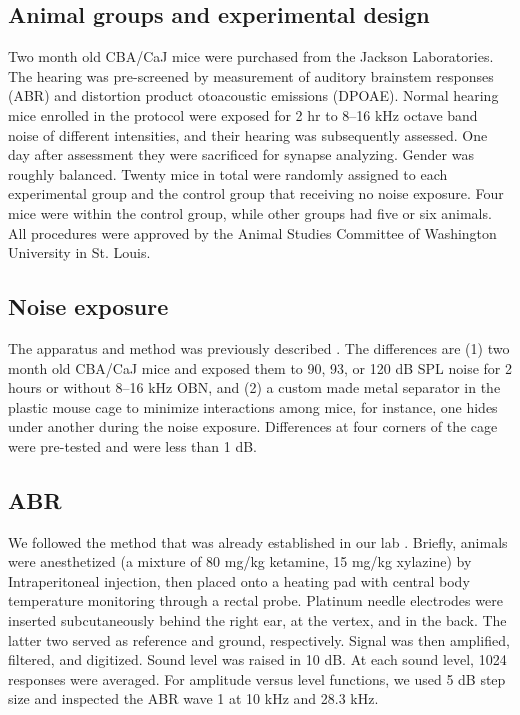 \documentclass[11pt]{article}
\begin{document}
\subsection {Animal groups and experimental design}
Two month old CBA/CaJ mice were purchased from the Jackson Laboratories. The hearing was pre-screened by measurement of auditory brainstem responses (ABR) and distortion product otoacoustic emissions (DPOAE). Normal hearing mice enrolled in the protocol were exposed for 2 hr to 8--16 kHz octave band noise of different intensities, and their hearing was subsequently assessed. One day after assessment they were sacrificed for synapse analyzing. Gender was roughly balanced. Twenty mice in total were randomly assigned to each experimental group and the control group that receiving no noise exposure. Four mice were within the control group, while other groups had five or six animals. All procedures were approved by the Animal Studies Committee of Washington University in St. Louis.

\subsection {Noise exposure}
The apparatus and method was previously described \cite{Ohlemiller2011}. The differences are (1) two month old CBA/CaJ mice and exposed them to 90, 93, or 120 dB SPL noise for 2 hours or without 8--16 kHz OBN, and (2) a custom made metal separator in the plastic mouse cage to minimize interactions among mice, for instance, one hides under another during the noise exposure. Differences at four corners of the cage were pre-tested and were less than 1 dB.

\subsection {ABR}
We followed the method that was already established in our lab \cite{Lei2011}. Briefly, animals were anesthetized (a mixture of 80 mg/kg ketamine, 15 mg/kg xylazine) by Intraperitoneal injection, then placed onto a heating pad with central body temperature monitoring through a rectal probe. Platinum needle electrodes were inserted subcutaneously behind the right ear, at the vertex, and in the back. The latter two served as reference and ground, respectively. Signal was then amplified, filtered, and digitized. Sound level was raised in 10 dB. At each sound level, 1024 responses were averaged. For amplitude versus level functions, we used 5 dB step size and inspected the ABR wave 1 at 10 kHz and 28.3 kHz.
\end{document}
